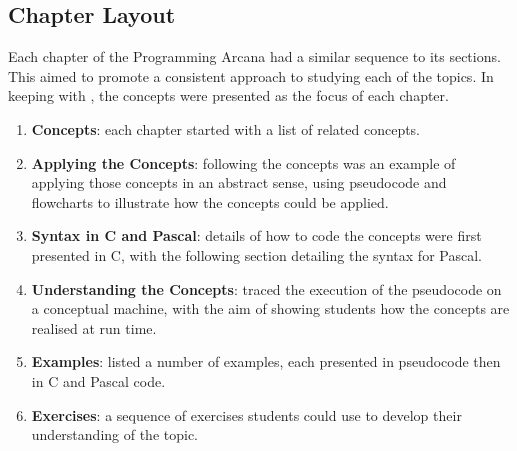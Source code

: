 


\subsection{Chapter Layout} %
\label{ssub:chapter_layout}

Each chapter of the Programming Arcana had a similar sequence to its sections. This aimed to promote a consistent approach to studying each of the topics. In keeping with , the concepts were presented as the focus of each chapter. %

\begin{enumerate}
  \item \textbf{Concepts}: each chapter started with a list of related concepts.
  \item \textbf{Applying the Concepts}: following the concepts was an example of applying those concepts in an abstract sense, using pseudocode and flowcharts to illustrate how the concepts could be applied.
  \item \textbf{Syntax in C and Pascal}: details of how to code the concepts were first presented in C, with the following section detailing the syntax for Pascal.
  \item \textbf{Understanding the Concepts}: traced the execution of the pseudocode on a conceptual machine, with the aim of showing students how the concepts are realised at run time. 
  \item \textbf{Examples}: listed a number of examples, each presented in pseudocode then in C and Pascal code.
  \item \textbf{Exercises}: a sequence of exercises students could use to develop their understanding of the topic.
\end{enumerate}

